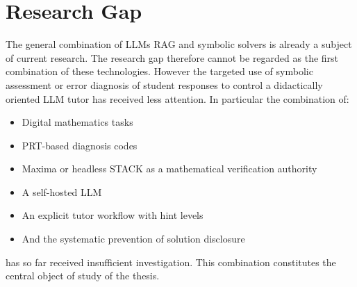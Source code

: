\documentclass[11pt,a4paper,oneside,ngerman]{memoir}
\begin{document}
\section{Research Gap}
The general combination of LLMs RAG and symbolic solvers is already a subject of current research. The research gap therefore cannot be regarded as the first combination of these technologies.
However the targeted use of symbolic assessment or error diagnosis of student responses to control a didactically oriented LLM tutor has received less attention. In particular the combination of:
\begin{itemize}
    \item Digital mathematics tasks
    \item PRT-based diagnosis codes
    \item Maxima or headless STACK as a mathematical verification authority
    \item A self-hosted LLM
    \item An explicit tutor workflow with hint levels
    \item And the systematic prevention of solution disclosure
\end{itemize}
has so far received insufficient investigation. This combination constitutes the central object of study of the thesis.
\end{document}
